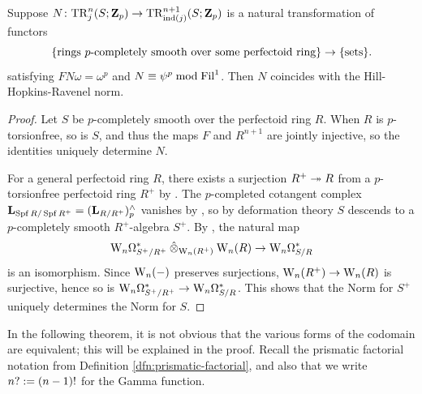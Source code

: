\begin{lemma}
  \label{lem:norm-ghost}
  Suppose $N\colon \TR^n_j(S;\Z_p) \to \TR^{n+1}_{\ind(j)}(S;\Z_p)$ is a natural transformation of functors
  \[ \{\text{\normalfont rings $p$-completely smooth over some perfectoid ring}\} \to \{\text{\normalfont sets}\}.\]
  satisfying $FN\omega = \omega^p$ and $N \equiv \psi^p \bmod \Fil^1$. Then $N$ coincides with the Hill-Hopkins-Ravenel norm. 
\end{lemma}
\begin{proof}
  Let $S$ be $p$-completely smooth over the perfectoid ring $R$. When $R$ is $p$-torsionfree, so is $S$, and thus the maps $F$ and $R^{n+1}$ are jointly injective, so the identities uniquely determine $N$.

  For a general perfectoid ring $R$, there exists a surjection $R^+ \epi R$ from a $p$-torsionfree perfectoid ring $R^+$ by \cite[Proposition 2.12]{CSPurity}. The $p$-completed cotangent complex $\L_{\Spf R/\Spf R^+} = (\L_{R/R^+})^\land_p$ vanishes by \cite[Lemma 3.14]{BMS1}, so by deformation theory $S$ descends to a $p$-completely smooth $R^+$-algebra $S^+$. By \cite[Proposition 10.14]{BMS1}, the natural map
  \[ \dRW[n]^*_{S^+/R^+} \mathbin{\hat\tnsr}_{\rmW_n(R^+)} \rmW_n(R) \to \dRW[n]^*_{S/R} \]
  is an isomorphism. Since $\rmW_n(-)$ preserves surjections, $\rmW_n(R^+) \to \rmW_n(R)$ is surjective, hence so is $\dRW[n]^*_{S^+/R^+} \to \dRW[n]^*_{S/R}$. This shows that the Norm for $S^+$ uniquely determines the Norm for $S$.
\end{proof}

In the following theorem, it is not obvious that the various forms of the codomain are equivalent; this will be explained in the proof. Recall the prismatic factorial notation from Definition \ref{dfn:prismatic-factorial}, and also that we write $n? \defeq (n-1)!$ for the Gamma function.

